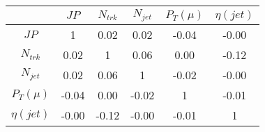 \begin{tabular}{|c|c|c|c|c|c|} 
\hline
 & $JP$ & $N_{trk}$ & $N_{jet}$ & $P_{T} (\mu)$ & $\eta (jet)$ \\ \hline
$JP$ & 1 & 0.02 & 0.02 & -0.04 & -0.00 \\
$N_{trk}$ & 0.02 & 1 & 0.06 & 0.00 & -0.12 \\
$N_{jet}$ & 0.02 & 0.06 & 1 & -0.02 & -0.00 \\
$P_{T} (\mu)$ & -0.04 & 0.00 & -0.02 & 1 & -0.01 \\
$\eta (jet)$ & -0.00 & -0.12 & -0.00 & -0.01 & 1 \\
\hline 
\end{tabular} 


